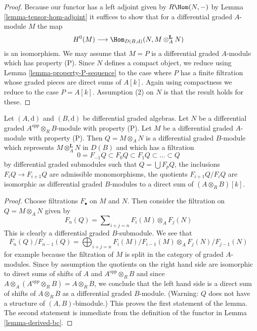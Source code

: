 \begin{proof}
Because our functor has a left adjoint given by
$R\Hom(N, -)$ by Lemma \ref{lemma-tensor-hom-adjoint}
it suffices to show that for a differential graded $A$-module $M$
the map
$$
H^0(M) \longrightarrow
\Hom_{D(B, \text{d})}(N, M \otimes_A^\mathbf{L} N)
$$
is an isomorphism. We may assume that $M = P$ is a differential graded
$A$-module which has property (P). Since $N$ defines a
compact object, we reduce using
Lemma \ref{lemma-property-P-sequence}
to the case where $P$ has a finite filtration whose graded pieces
are direct sums of $A[k]$. Again using compactness we reduce
to the case $P = A[k]$. Assumption (2) on $N$ is that
the result holds for these.
\end{proof}

\begin{lemma}
\label{lemma-P-not-preserved-base-change}
Let $(A, \text{d})$ and $(B, \text{d})$ be differential graded algebras.
Let $N$ be a differential graded $A^{opp} \otimes_R B$-module with property
(P). Let $M$ be a differential graded $A$-module with property (P).
Then $Q = M \otimes_A N$ is a differential graded $B$-module which represents
$M \otimes_A^\mathbf{L} N$ in $D(B)$ and which has a filtration
$$
0 = F_{-1}Q \subset F_0Q \subset F_1Q \subset \ldots \subset Q
$$
by differential graded submodules such that $Q = \bigcup F_pQ$,
the inclusions $F_iQ \to F_{i + 1}Q$ are admissible monomorphisms,
the quotients $F_{i + 1}Q/F_iQ$ are isomorphic as differential
graded $B$-modules to a direct sum of $(A \otimes_R B)[k]$.
\end{lemma}

\begin{proof}
Choose filtrations $F_\bullet$ on $M$ and $N$. Then consider the filtration
on $Q = M \otimes_A N$ given by
$$
F_n(Q) = \sum\nolimits_{i + j = n}
F_i(M) \otimes_A F_j(N)
$$
This is clearly a differential graded $B$-submodule. We see that
$$
F_n(Q)/F_{n - 1}(Q) =
\bigoplus\nolimits_{i + j = n}
F_i(M)/F_{i - 1}(M) \otimes_A F_j(N)/F_{j - 1}(N)
$$
for example because the filtration of $M$ is split in the category
of graded $A$-modules. Since by assumption the quotients on the right
hand side are isomorphic to direct sums of shifts of $A$ and
$A^{opp} \otimes_R B$ and since
$A \otimes_A (A^{opp} \otimes_R B) = A \otimes_R B$,
we conclude that the left hand side is a direct sum of shifts
of $A \otimes_R B$ as a differential graded $B$-module.
(Warning: $Q$ does not have a structure of $(A, B)$-bimodule.)
This proves the first statement of the lemma.
The second statement is immediate from
the definition of the functor in Lemma \ref{lemma-derived-bc}.
\end{proof}






